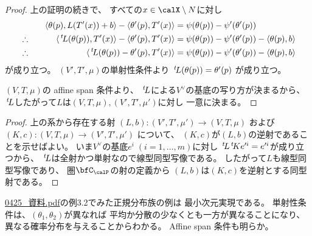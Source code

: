 \documentclass[report]{jlreq}
\begin{document}
\begin{proof}
    上の証明の続きで、
    すべての$x \in \calX \setminus N$に対し
    \begin{alignat}{2}
        &\phantom{\therefore}&
            \left\langle{\theta(p)},{L(T'(x)) + b}\right\rangle
            - \left\langle{\theta'(p)},{T'(x)}\right\rangle
            &=
                \psi(\theta(p)) - \psi'(\theta'(p))
                \\
        &\therefore \quad&
            \langle{\,{}^{t}\!L(\theta(p))},{T'(x)}\rangle
            - \left\langle{\theta'(p)},{T'(x)}\right\rangle
            &=
                \psi(\theta(p)) - \psi'(\theta'(p))
                - \left\langle{\theta(p)},{b}\right\rangle
                \\
        &\therefore \quad&
            \langle{\,{}^{t}\!L(\theta(p)) - \theta'(p)},{T'(x)}\rangle
            &=
                \psi(\theta(p)) - \psi'(\theta'(p))
                - \left\langle{\theta(p)},{b}\right\rangle
    \end{alignat}
    が成り立つ。
    $(V', T', \mu)$の単射性条件より
    $\,{}^{t}\!L(\theta(p)) = \theta'(p)$
    が成り立つ。

    $(V, T, \mu)$の
    affine span 条件より、
    $\,{}^{t}\!L$による$V^\vee$の基底の写り方が決まるから、
    $\,{}^{t}\!L$したがって$L$は$(V, T, \mu), (V', T', \mu')$に対し
    一意に決まる。
\end{proof}


\begin{proof}
    上の系から存在する射
    $(L, b) \colon (V', T', \mu') \to (V, T, \mu)$
    および
    $(K, c) \colon (V, T, \mu) \to (V', T', \mu')$
    について、
    $(K, c)$が$(L, b)$の逆射であることを示せばよい。
    いま$V^\vee$の基底$e^i \; (i = 1, \dots, m)$に対し
    $\,{}^{t}\!L \,{}^{t}\!K e'^i = e'^i$が成り立つから、
    $\,{}^{t}\!L$は全射かつ単射なので線型同型写像である。
    したがって$L$も線型同型写像であり、
    圏$\bfC_\calP$の射の定義から
    $(L, b)$は$(K, c)$を逆射とする同型射である。
\end{proof}

\begin{remark}[正規分布族の最小次元実現]
    \url{0425_資料.pdf}の例3.2でみた正規分布族の例は
    最小次元実現である。
    単射性条件は、$(\theta_1, \theta_2)$が異なれば
    平均か分散の少なくとも一方が異なることになり、
    異なる確率分布を与えることからわかる。
    Affine span 条件も明らか。
\end{remark}
\end{document}
